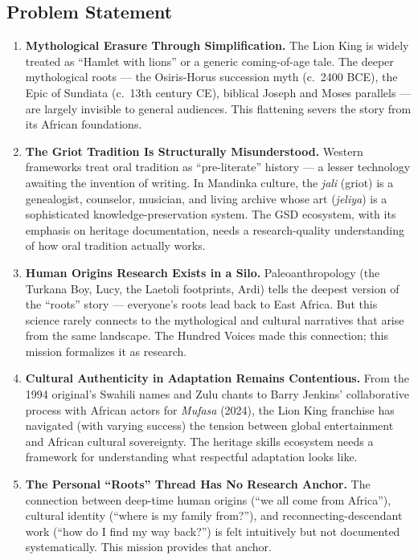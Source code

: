 \documentclass[11pt,letterpaper]{article}
\begin{document}
\subsection{Problem Statement}

\begin{enumerate}[leftmargin=2em]
  \item \textbf{Mythological Erasure Through Simplification.} The Lion King is widely treated as ``Hamlet with lions'' or a generic coming-of-age tale. The deeper mythological roots --- the Osiris-Horus succession myth (c.~2400 BCE), the Epic of Sundiata (c.~13th century CE), biblical Joseph and Moses parallels --- are largely invisible to general audiences. This flattening severs the story from its African foundations.

  \item \textbf{The Griot Tradition Is Structurally Misunderstood.} Western frameworks treat oral tradition as ``pre-literate'' history --- a lesser technology awaiting the invention of writing. In Mandinka culture, the \textit{jali} (griot) is a genealogist, counselor, musician, and living archive whose art (\textit{jeliya}) is a sophisticated knowledge-preservation system. The GSD ecosystem, with its emphasis on heritage documentation, needs a research-quality understanding of how oral tradition actually works.

  \item \textbf{Human Origins Research Exists in a Silo.} Paleoanthropology (the Turkana Boy, Lucy, the Laetoli footprints, Ardi) tells the deepest version of the ``roots'' story --- everyone's roots lead back to East Africa. But this science rarely connects to the mythological and cultural narratives that arise from the same landscape. The Hundred Voices made this connection; this mission formalizes it as research.

  \item \textbf{Cultural Authenticity in Adaptation Remains Contentious.} From the 1994 original's Swahili names and Zulu chants to Barry Jenkins' collaborative process with African actors for \textit{Mufasa} (2024), the Lion King franchise has navigated (with varying success) the tension between global entertainment and African cultural sovereignty. The heritage skills ecosystem needs a framework for understanding what respectful adaptation looks like.

  \item \textbf{The Personal ``Roots'' Thread Has No Research Anchor.} The connection between deep-time human origins (``we all come from Africa''), cultural identity (``where is my family from?''), and reconnecting-descendant work (``how do I find my way back?'') is felt intuitively but not documented systematically. This mission provides that anchor.
\end{enumerate}
\end{document}
